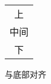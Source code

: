 \documentclass[nofonts]{ctexart}
\begin{document}
\begin{tabular}[b]{c}
	上		\\
	中间	\\
	下		\\
\end{tabular}
与底部对齐
\end{document}
